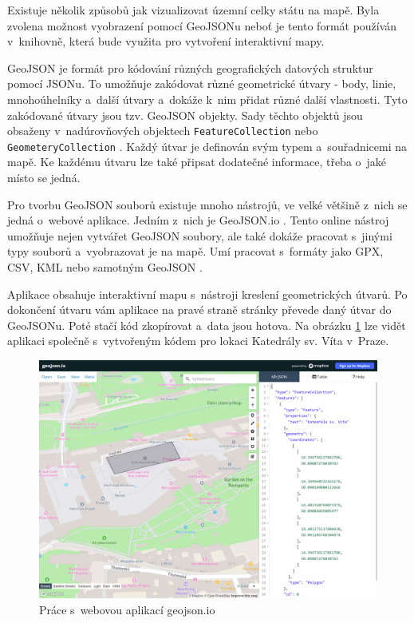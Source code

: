 Existuje několik způsobů jak vizualizovat územní celky státu na mapě. Byla zvolena možnost vyobrazení pomocí GeoJSONu neboť je tento formát používán v~knihovně, která bude využita pro vytvoření interaktivní mapy.

GeoJSON je formát pro kódování různých geografických datových struktur pomocí JSONu. To umožňuje zakódovat různé geometrické útvary - body, linie, mnohoúhelníky a~další útvary a~dokáže k~nim přidat různé další vlastnosti. Tyto zakódované útvary jsou tzv. GeoJSON objekty. Sady těchto objektů jsou obsaženy v~nadúrovňových objektech \lstinline{FeatureCollection} nebo \lstinline{GeometeryCollection} \cite{google-scholar-geojson}. Každý útvar je definován svým typem a~souřadnicemi na mapě. Ke každému útvaru lze také připsat dodatečné informace, třeba o~jaké místo se jedná.

Pro tvorbu GeoJSON souborů existuje mnoho nástrojů, ve velké většině z~nich se jedná o~webové aplikace. Jedním z~nich je GeoJSON.io \cite{geojson.io}. Tento online nástroj umožňuje nejen vytvářet GeoJSON soubory, ale také dokáže pracovat s~jinými typy souborů a~vyobrazovat je na mapě. Umí pracovat s~formáty jako GPX, CSV, KML nebo samotným GeoJSON \cite{geojson.io}.

Aplikace obsahuje interaktivní mapu s~nástroji kreslení geometrických útvarů. Po dokončení útvaru vám aplikace na pravé straně stránky převede daný útvar do GeoJSONu. Poté stačí kód zkopírovat a~data jsou hotova. Na obrázku \ref{fig:GeoJson.ioScreen} lze vidět aplikaci společně s~vytvořeným kódem pro lokaci Katedrály sv. Víta v~Praze.

\begin{figure}[h]
	\centering
	\includegraphics[width=1\textwidth]{Pictures/geojson_screen.png}
	\caption{Práce s~webovou aplikací geojson.io \cite{geojson.io}}
	\label{fig:GeoJson.ioScreen}
\end{figure}